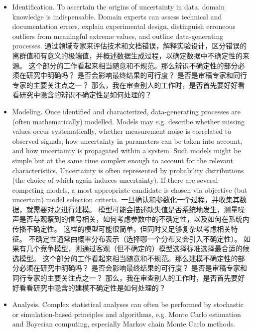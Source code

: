 \documentclass[a4paper]{ctexart}
\begin{document}
\begin{itemize}
      \item[\textbf{辨识}] Identification.
            To ascertain the origins of uncertainty in data, domain knowledge is indispensable.
            Domain experts can assess technical and documentation errors, explain experimental design, distinguish erroneous outliers from meaningful extreme values, and outline data-generating processes.
            通过领域专家来评估技术和文档错误，解释实验设计，区分错误的离群值和有意义的极端值，并概述数据生成过程，以确定数据中不确定性的来源。
            这个部分的工作看起来相当随意和不规范。那么辨识不确定性的部分必须在研究中明确吗？
            是否会影响最终结果的可行度？
            是否是审稿专家和同行专家的主要关注点之一？
            那么，我在审查别人的工作时，是否首先要好好看看研究中隐含的辨识不确定性是如何处理的？
      \item[\textbf{建模}] Modeling.
            Once identified and characterized, data-generating processes are (often mathematically) modelled.
            Models may e.g. describe whether missing values occur systematically, whether measurement noise is correlated to observed signals, how uncertainty in parameters can be taken into account, and how uncertainty is propagated within a system.
            Such models might be simple but at the same time complex enough to account for the relevant characteristics.
            Uncertainty is often represented by probability distributions (the choice of which again induces uncertainty).
            If there are several competing models, a most appropriate candidate is chosen via objective (but uncertain) model selection criteria.
            一旦确认和参数化一个过程，并收集其数据，就需要对之进行建模。
            模型可能会描述缺失值是否系统地发生，测量噪声是否与观察到的信号相关，如何考虑参数中的不确定性，以及如何在系统内传播不确定性。
            这样的模型可能很简单，但同时又足够复杂以考虑相关特征。
            不确定性通常由概率分布表示（选择哪一个分布又会引入不确定性）。
            如果有几个竞争模型，则通过客观（但不确定的）模型选择标准选择最合适的候选模型。
            这个部分的工作看起来相当随意和不规范。那么建模不确定性的部分必须在研究中明确吗？
            是否会影响最终结果的可行度？
            是否是审稿专家和同行专家的主要关注点之一？
            那么，我在审查别人的工作时，是否首先要好好看看研究中隐含的建模不确定性是如何处理的？
      \item[\textbf{分析}] Analysis.
            Complex statistical analyses can often be performed by stochastic or simulation-based principles and algorithms, e.g. Monte Carlo estimation and Bayesian computing, especially Markov chain Monte Carlo methods.

\end{itemize}
\end{document}
